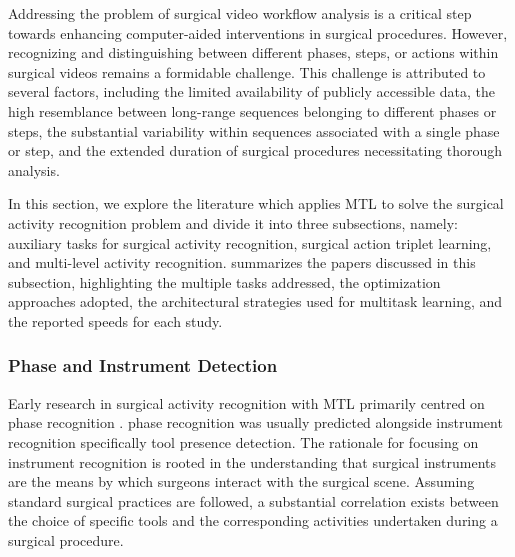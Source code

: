Addressing the problem of surgical video workflow analysis is a critical step towards enhancing computer-aided interventions in surgical procedures. However, recognizing and distinguishing between different phases, steps, or actions within surgical videos remains a formidable challenge. This challenge is attributed to several factors, including the limited availability of publicly accessible data, the high resemblance between long-range sequences belonging to different phases or steps, the substantial variability within sequences associated with a single phase or step, and the extended duration of surgical procedures necessitating thorough analysis.

In this section, we explore the literature which applies MTL to solve the surgical activity recognition problem and divide it into three subsections, namely: auxiliary tasks for surgical activity recognition, surgical action triplet learning, and multi-level activity recognition. 
 summarizes the papers discussed in this subsection, highlighting the multiple tasks addressed, the optimization approaches adopted, the architectural strategies used for multitask learning, and the reported speeds for each study. 


\subsubsection{Phase and Instrument Detection}
Early research in surgical activity recognition with MTL primarily centred on phase recognition \citep{EndoNet,tecno,Sanchez-Matilla2022_data_centric,multi_task_recurrent_conv}. 
phase recognition was usually predicted alongside instrument recognition specifically tool presence detection. The rationale for focusing on instrument recognition is rooted in the understanding that surgical instruments are the means by which surgeons interact with the surgical scene. Assuming standard surgical practices are followed, a substantial correlation exists between the choice of specific tools and the corresponding activities undertaken during a surgical procedure. 



